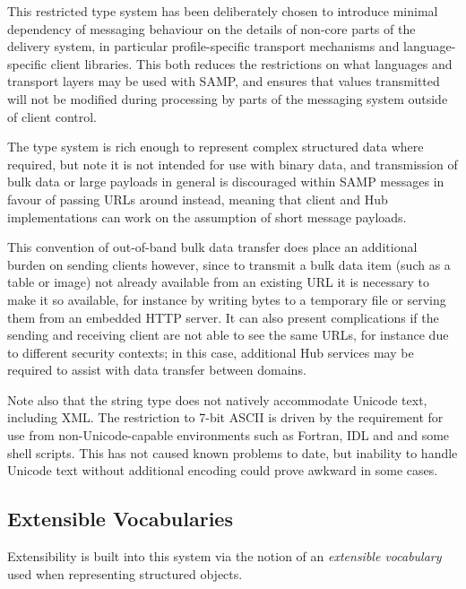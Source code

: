 \documentclass[5p]{elsarticle}
\begin{document}
This restricted type system has been deliberately chosen to introduce
minimal dependency of messaging behaviour on the details of
non-core parts of the delivery system,
in particular profile-specific transport mechanisms and language-specific
client libraries.
This both reduces the restrictions on what languages and transport layers
may be used with SAMP, and ensures that values transmitted will
not be modified during processing by parts of the messaging system
outside of client control.


The type system is rich enough to represent complex structured data
where required, but note it is not intended for use with
binary data, and transmission of bulk data or large payloads
in general is discouraged within SAMP messages in favour of
passing URLs around instead, meaning that
client and Hub implementations can work on the assumption
of short message payloads.

This convention of out-of-band bulk data transfer does place
an additional burden on sending clients however,
since to transmit a bulk data item (such as a table or image)
not already available from an existing URL
it is necessary to make it so available, for instance by writing
bytes to a temporary file or serving them from an embedded HTTP server.
It can also present complications if the sending and receiving client
are not able to see the same URLs, for instance due to different security
contexts; in this case, additional Hub services may be required to
assist with data transfer between domains.

Note also that the string type does not natively accommodate Unicode text,
including XML.
The restriction to 7-bit ASCII is driven by the requirement for use
from non-Unicode-capable environments such as Fortran, IDL and
and some shell scripts.
This has not caused known problems to date, but inability to handle
Unicode text without additional encoding could prove awkward in
some cases.

\subsection{Extensible Vocabularies} \label{sec:extVocabs}

Extensibility is built into this system via the notion of an
{\em extensible vocabulary} used when representing structured objects.
\end{document}
